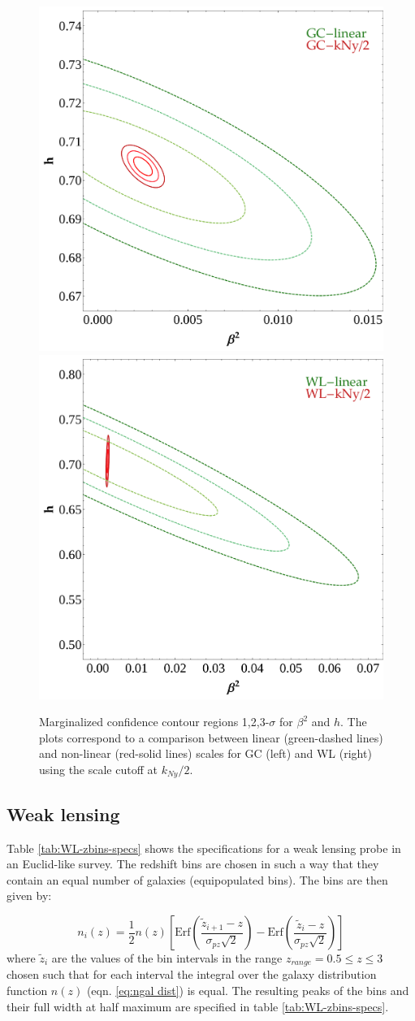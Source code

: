 \begin{figure}
\centering{}\includegraphics[height=0.45\textwidth]{Chapters/fitting-funcs/figures/GC-linear-vs-PkCut-1p1-kNy-margedContours-h-beta}
\includegraphics[height=0.45\textwidth]{Chapters/fitting-funcs/figures/WL-linear-vs-PkCut-1p1-kNy-margedContours-h-beta}
\caption[Fisher confidence contour regions
for $\beta^{2}$ and $h$ in CDE using GC and WL surveys.]{\label{fig:Contour-scale} Marginalized confidence contour regions
1,2,3-$\sigma$ for $\beta^{2}$ and $h$. The plots correspond to
a comparison between linear (green-dashed lines) and non-linear (red-solid
lines) scales for GC (left) and WL (right) using the scale cutoff
at $k_{Ny}/2$. }
\end{figure}



\subsection{Weak lensing}

Table \ref{tab:WL-zbins-specs} shows the specifications for a
weak lensing probe in an Euclid-like survey. The redshift bins are
chosen in such a way that they contain an equal number of galaxies
(equipopulated bins). The bins are then given by:

\begin{equation}
n_{i}(z)=\frac{1}{2}n(z)\left[\mbox{Erf}\left(\frac{\tilde{z}_{i+1}-z}{\sigma_{pz}\sqrt{2}}\right)-\mbox{Erf}\left(\frac{\tilde{z}_{i}-z}{\sigma_{pz}\sqrt{2}}\right)\right]
\end{equation}
where $\tilde{z}_{i}$ are the values of the bin intervals in the
range $z_{range}=0.5\leq z\leq3$ chosen such that for each interval
the integral over the galaxy distribution function $n(z)$ (eqn. \ref{eq:ngal dist})
is equal. The resulting peaks of the bins and their full width at
half maximum are specified in table \ref{tab:WL-zbins-specs}.

